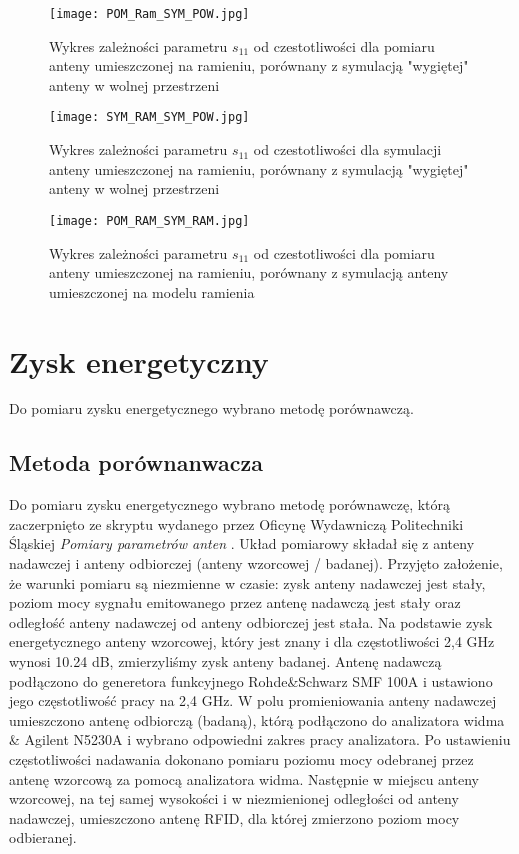 \newpage
\begin{figure}[H]
\centering 
	\texttt{[image: POM\_Ram\_SYM\_POW.jpg]}
	\caption{Wykres zależności parametru $s_{11}$ od czestotliwości dla pomiaru anteny umieszczonej na ramieniu, porównany z symulacją "wygiętej" anteny w wolnej przestrzeni}
\end{figure}

\newpage
\begin{figure}[H]
\centering
	\texttt{[image: SYM\_RAM\_SYM\_POW.jpg]}
	\caption{Wykres zależności parametru $s_{11}$ od czestotliwości dla symulacji anteny umieszczonej na ramieniu, porównany z symulacją "wygiętej" anteny w wolnej przestrzeni}
\end{figure}


\newpage
\begin{figure}[H]
\centering
	\texttt{[image: POM\_RAM\_SYM\_RAM.jpg]}
	\caption{Wykres zależności parametru $s_{11}$ od czestotliwości dla pomiaru anteny umieszczonej na ramieniu, porównany z symulacją anteny umieszczonej na modelu ramienia}
\end{figure}





\newpage
\section{Zysk energetyczny}

Do pomiaru zysku energetycznego wybrano metodę porównawczą.

\subsection {Metoda porównanwacza}

Do pomiaru zysku energetycznego wybrano metodę porównawczę, którą zaczerpnięto ze skryptu wydanego przez Oficynę Wydawniczą Politechniki Śląskiej \emph{Pomiary parametrów anten} \cite{Pomiary_parametrów}. Układ pomiarowy składał się z anteny nadawczej  i anteny odbiorczej (anteny wzorcowej / badanej). Przyjęto założenie, że warunki pomiaru są niezmienne w czasie: zysk anteny nadawczej jest stały, poziom mocy sygnału emitowanego przez antenę nadawczą jest stały oraz odległość anteny nadawczej od anteny odbiorczej jest stała. Na podstawie zysk energetycznego anteny wzorcowej, który jest znany i dla częstotliwości 2,4 GHz wynosi 10.24 dB, zmierzyliśmy zysk anteny badanej. Antenę nadawczą podłączono do generetora funkcyjnego 
Rohde\&Schwarz SMF 100A i ustawiono jego częstotliwość pracy na 2,4 GHz. W polu promieniowania anteny nadawczej umieszczono antenę odbiorczą (badaną), którą podłączono do analizatora widma \& Agilent N5230A i wybrano odpowiedni zakres pracy analizatora. Po ustawieniu częstotliwości nadawania dokonano pomiaru poziomu mocy odebranej przez antenę wzorcową za pomocą analizatora widma. Następnie w miejscu anteny wzorcowej, na tej samej wysokości i w niezmienionej odległości od anteny nadawczej, umieszczono antenę RFID, dla której zmierzono poziom mocy odbieranej. 


